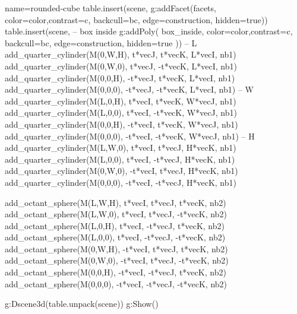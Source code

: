 \documentclass[border=5pt]{standalone}%
\begin{document}
\begin{luadraw}{name=rounded-cube}
table.insert(scene, g:addFacet(facets, {color=color,contrast=c, 
    backcull=bc, edge=construction, hidden=true}))
table.insert(scene, -- box inside
    g:addPoly( box_inside,{ color=color,contrast=c, backcull=bc, edge=construction, hidden=true }))
-- L
add_quarter_cylinder(M(0,W,H), t*vecJ, t*vecK, L*vecI, nb1)
add_quarter_cylinder(M(0,W,0), t*vecJ, -t*vecK, L*vecI, nb1)
add_quarter_cylinder(M(0,0,H), -t*vecJ, t*vecK, L*vecI, nb1)
add_quarter_cylinder(M(0,0,0), -t*vecJ, -t*vecK, L*vecI, nb1)
-- W
add_quarter_cylinder(M(L,0,H), t*vecI, t*vecK, W*vecJ, nb1)
add_quarter_cylinder(M(L,0,0), t*vecI, -t*vecK, W*vecJ, nb1)
add_quarter_cylinder(M(0,0,H), -t*vecI, t*vecK, W*vecJ, nb1)
add_quarter_cylinder(M(0,0,0), -t*vecI, -t*vecK, W*vecJ, nb1)
-- H
add_quarter_cylinder(M(L,W,0), t*vecI, t*vecJ, H*vecK, nb1)
add_quarter_cylinder(M(L,0,0), t*vecI, -t*vecJ, H*vecK, nb1)
add_quarter_cylinder(M(0,W,0), -t*vecI, t*vecJ, H*vecK, nb1)
add_quarter_cylinder(M(0,0,0), -t*vecI, -t*vecJ, H*vecK, nb1)

add_octant_sphere(M(L,W,H), t*vecI, t*vecJ, t*vecK, nb2)
add_octant_sphere(M(L,W,0), t*vecI, t*vecJ, -t*vecK, nb2)
add_octant_sphere(M(L,0,H), t*vecI, -t*vecJ, t*vecK, nb2)
add_octant_sphere(M(L,0,0), t*vecI, -t*vecJ, -t*vecK, nb2)
add_octant_sphere(M(0,W,H), -t*vecI, t*vecJ, t*vecK, nb2)
add_octant_sphere(M(0,W,0), -t*vecI, t*vecJ, -t*vecK, nb2)
add_octant_sphere(M(0,0,H), -t*vecI, -t*vecJ, t*vecK, nb2)
add_octant_sphere(M(0,0,0), -t*vecI, -t*vecJ, -t*vecK, nb2)

g:Dscene3d(table.unpack(scene))
g:Show()
\end{luadraw}
\end{document}
